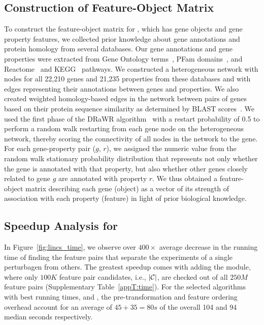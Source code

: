 \subsection{Construction of \msig Feature-Object Matrix} \label{app:msig_matrix}
To construct the feature-object matrix for \msig, which has gene objects and gene property features, we collected prior knowledge about gene annotations and protein homology from several databases.
Our gene annotations and gene properties were extracted from Gene Ontology terms~\cite{gene2014gene},
PFam domains~\cite{finn2015pfam}, and Reactome~\cite{fabregat2017reactome}  and KEGG~\cite{kanehisa2016kegg} pathways.
We constructed a heterogeneous  network with nodes for all 22,210 genes and 21,235 properties from these databases and with edges representing their annotations between genes and properties.
We also created weighted homology-based edges in the network between pairs of genes based on their protein sequence similarity as determined by BLAST scores~\cite{altschul1990basic}.
We used the first phase of the DRaWR algorithm~\cite{blatti2016characterizing} with a restart probability of 0.5 to perform a random walk restarting from each gene node on the heterogeneous network, thereby scoring the connectivity of all nodes in the network to the gene.
For each gene-property pair ($g$, $r$), we assigned the numeric value from the random walk stationary probability distribution that represents not only whether the gene is annotated with that property, but also whether other genes closely related to gene $g$ are annotated with property $r$.
We thus obtained a feature-object matrix describing each gene (object) as a vector of its strength of association with each property (feature) in light of prior biological knowledge.


\subsection{Speedup Analysis for \lincs} \label{app:lincs}
In Figure~\ref{fig:lincs_time}, we observe over $400\times$ average decrease in the running time of finding the \topk feature pairs that separate the \lincs experiments of a single perturbagen from others. The greatest speedup comes with adding the \sampling module, where only $100K$ feature pair candidates, i.e., $|{\mathcal{C}}|$, are checked out of all $250M$ feature pairs (Supplementary Table~\ref{appT:time}). For the selected algorithms with best running times, \horiz and \vertic, the pre-transformation and feature ordering overhead account for an average of $45+35=80s$ of the overall 104 and 94 median seconds respectively.


